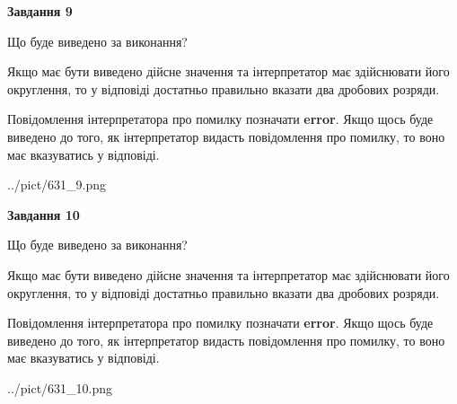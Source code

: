 \documentclass[12pt, ukrainian]{article}
\begin{document}
{\begin {Large}
{\begin {center}\textbf{Завдання 9}\end {center}}\par
Що буде виведено за виконання? \par

Якщо має бути виведено дійсне значення та інтерпретатор має здійснювати його округлення, 
то у відповіді достатньо правильно вказати два дробових розряди.

Повідомлення інтерпретатора про помилку позначати \textbf{error}.
Якщо щось буде виведено до того, як інтерпретатор видасть повідомлення про помилку, 
то воно має вказуватись у відповіді. \par

\begin{center}
	{../pict/631_9.png}
\end{center}
\newpage

{\begin {center}\textbf{Завдання 10}\end {center}}\par
Що буде виведено за виконання? \par

Якщо має бути виведено дійсне значення та інтерпретатор має здійснювати його округлення, 
то у відповіді достатньо правильно вказати два дробових розряди.

Повідомлення інтерпретатора про помилку позначати \textbf{error}.
Якщо щось буде виведено до того, як інтерпретатор видасть повідомлення про помилку, 
то воно має вказуватись у відповіді. \par

\begin{center}
	{../pict/631_10.png}
\end{center}
\newpage

\end {Large}}
\end{document}
